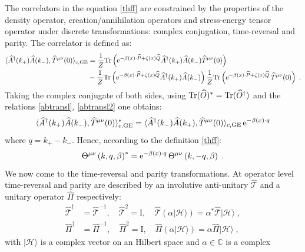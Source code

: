 \documentclass[prd,superscriptaddress,nofootinbib,notitlepage]{revtex4-1}
\def\wT{{\widehat T}}
\def\wP{{\widehat P}}
\def\wA{{\widehat A}}
\def\wQ{{\widehat Q}}
\def\wPi{{\widehat\Pi}}
\def\wA{\widehat A}
\def\wAd{\widehat A^{\dagger}}
\def\wO{\widehat O}
\def\wQ{\widehat Q}
\def\wPi{\widehat \Pi}
\def\wmT{\widehat {\mathcal{T}}}
\def\wPi{\widehat{\Pi}}
\newcommand{\Tr}{{\rm Tr}}
\newcommand{\e}{{\rm e}}
\begin{document}
The correlators in the equation \eqref{thff} are constrained by the properties of the density operator, creation/annihilation operators and stress-energy tensor operator under discrete transformations: complex conjugation, 
time-reversal and parity. The correlator is defined as:
%
\begin{equation}\label{App: Definizione Exp Val}
 \begin{split}
     \langle\wAd(k_+)\wA(k_-),\wT^{\mu\nu}(0)\rangle_{c,\mathrm{GE}}  &=\frac{1}{Z}\Tr\left(\e^{-\beta(x)\cdot\wP+\zeta(x)\wQ}\wAd(k_+)\wA(k_-)\wT^{\mu\nu}(0)\right)\\
 &-
\frac{1}{Z}\Tr\left(\e^{-\beta(x)\cdot\wP+\zeta(x)\wQ}\wAd(k_+)\wA(k_-)\right) 
\frac{1}{Z}\Tr\left(\e^{-\beta(x)\cdot\wP+\zeta(x)\wQ}\,\wT^{\mu\nu}(0)\right)\;.
 \end{split}
\end{equation}
%
Taking the complex conjugate of both sides, using $\Tr(\wO)^*=\Tr(\wO^\dagger)$ and the relations \eqref{abtransl}, \eqref{abtransl2}
one obtains:
%
\begin{equation*}
 \langle\wAd(k_+)\wA(k_-),\wT^{\mu\nu}(0)\rangle_{c,\mathrm{GE}}^* = 
 \langle\wAd(k_-)\wA(k_+),\wT^{\mu\nu}(0)\rangle_{c,\mathrm{GE}} \, \e^{-\beta(x) \cdot q}
\end{equation*}
%
where $q=k_+-k_-$. Hence, according to the definition \eqref{thff}:
%
\begin{equation}\label{app parity:ThetaKMS}
    \Theta^{\mu\nu}\left(k,q,\beta\right)^*=\e^{-\beta(x)\cdot q}\,\Theta^{\mu\nu}\left(k,-q,\beta\right)\;.
\end{equation}
%
We now come to the time-reversal and parity transformations. At operator level time-reversal and parity are described by an 
involutive anti-unitary $\wmT$ and a unitary operator $\wPi$ respectively:
%
\begin{subequations}\label{App1: TR operator}
    \begin{align}
        \wmT^{\dagger}&=\wmT^{-1},\quad\wmT^2=\mathrm{I},\quad \wmT\left(\alpha\left|\mathcal{H}\right.\rangle\right)=\alpha^*\wmT\left|\mathcal{H}\right.\rangle\;,\\
        \wPi^\dagger&=\wPi^{-1},\quad \wPi^2=\mathrm{I},\quad \wPi\left(\alpha\left|\mathcal{H}\right.\rangle\right)=\alpha\wPi\left|\mathcal{H}\right.\rangle\;,
    \end{align}
\end{subequations}
%
with $\left|\mathcal{H}\right.\rangle$ is a complex vector on an Hilbert space and $\alpha\in\mathbb{C}$ is a complex 
\end{document}
